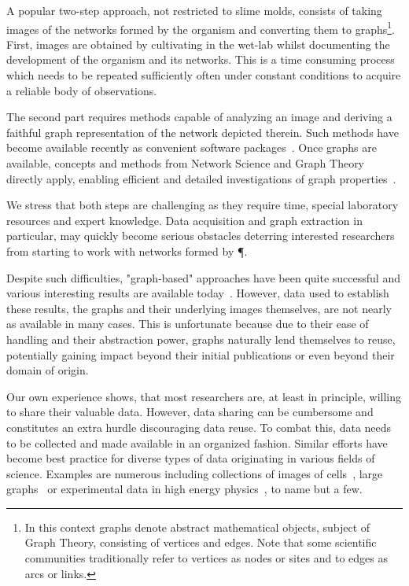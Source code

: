  	A popular two-step approach, not restricted to slime molds, consists of taking images of the networks formed by the organism and converting them to graphs\footnote{In this context graphs denote abstract mathematical objects, subject of Graph Theory, consisting of vertices and edges. Note that some scientific communities traditionally refer to vertices as nodes or sites and to edges as arcs or links.}. First, images are obtained by cultivating \Pp in the wet-lab whilst documenting the development of the organism and its networks. This is a time consuming process which needs to be repeated sufficiently often under constant conditions to acquire a reliable body of observations. 

 	The second part requires methods capable of analyzing an image and deriving a faithful graph representation of the network depicted therein. Such methods have become available recently as convenient software packages~\cite{dirnberger2015nefi}. Once graphs are available, concepts and methods from Network Science and Graph Theory directly apply, enabling efficient and detailed investigations of graph properties~\cite{baumgarten2012computational,heaton2012analysis}.

 	We stress that both steps are challenging as they require time, special laboratory resources and expert knowledge. Data acquisition and graph extraction in particular, may quickly become serious obstacles deterring interested researchers from starting to work with networks formed by \P. 

 	Despite such difficulties, "graph-based" approaches have been quite successful and various interesting results are available today~\cite{baumgarten2010plasmodial,baumgarten2013functional,fessel2014analytical,fessel2012Physarum,ito2011characterization}. However, data used to establish these results, \ie the graphs and their underlying images themselves, are not nearly as available in many cases. This is unfortunate because due to their ease of handling and their abstraction power, graphs naturally lend themselves to reuse, potentially gaining impact beyond their initial publications or even beyond their domain of origin.

 	Our own experience shows, that most researchers are, at least in principle, willing to share their valuable data. However, data sharing can be cumbersome and constitutes an extra hurdle discouraging data reuse. To combat this, data needs to be collected and made available in an organized fashion. Similar efforts have become best practice for diverse types of data originating in various fields of science. Examples are numerous including collections of images of cells~\cite{cell}, large graphs~\cite{snap} or experimental data in high energy physics~\cite{hepdata}, to name but a few.

